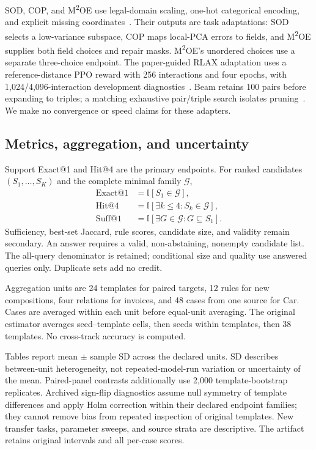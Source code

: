 \documentclass[conference]{IEEEtran}
\begin{document}
SOD, COP, and M\textsuperscript{2}OE use legal-domain scaling, one-hot categorical encoding, and explicit missing coordinates~\cite{kriegel2009sod,kriegel2012cop,angiulli2024m2oe}. Their outputs are task adaptations: SOD selects a low-variance subspace, COP maps local-PCA errors to fields, and M\textsuperscript{2}OE supplies both field choices and repair masks. M\textsuperscript{2}OE's unordered choices use a separate three-choice endpoint. The paper-guided RLAX adaptation uses a reference-distance PPO reward with 256 interactions and four epochs, with 1,024/4,096-interaction development diagnostics~\cite{amirato2026rlax}. Beam retains 100 pairs before expanding to triples; a matching exhaustive pair/triple search isolates pruning~\cite{myrtakis2021comparative}. We make no convergence or speed claims for these adapters.

\subsection{Metrics, aggregation, and uncertainty}
Support Exact@1 and Hit@4 are the primary endpoints. For ranked candidates $(S_1,\ldots,S_K)$ and the complete minimal family $\mathcal G$,
\begin{align}
\mathrm{Exact@1}&=\mathbb I[S_1\in\mathcal G],\\
\mathrm{Hit@4}&=\mathbb I[\exists k\leq4:S_k\in\mathcal G],\\
\mathrm{Suff@1}&=\mathbb I[\exists G\in\mathcal G:G\subseteq S_1].
\end{align}
Sufficiency, best-set Jaccard, rule scores, candidate size, and validity remain secondary. An answer requires a valid, non-abstaining, nonempty candidate list. The all-query denominator is retained; conditional size and quality use answered queries only. Duplicate sets add no credit.

Aggregation units are 24 templates for paired targets, 12 rules for new compositions, four relations for invoices, and 48 cases from one source for Car. Cases are averaged within each unit before equal-unit averaging. The original estimator averages seed--template cells, then seeds within templates, then 38 templates. No cross-track accuracy is computed.

Tables report mean $\pm$ sample SD across the declared units. SD describes between-unit heterogeneity, not repeated-model-run variation or uncertainty of the mean. Paired-panel contrasts additionally use 2,000 template-bootstrap replicates. Archived sign-flip diagnostics assume null symmetry of template differences and apply Holm correction within their declared endpoint families; they cannot remove bias from repeated inspection of original templates. New transfer tasks, parameter sweeps, and source strata are descriptive. The artifact retains original intervals and all per-case scores.
\end{document}

